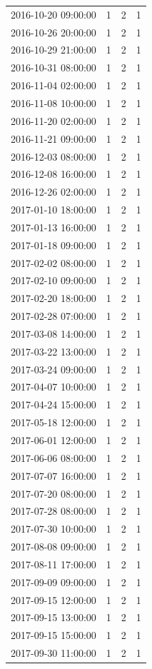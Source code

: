 \begin{tabular}{lrrr}
2016-10-20 09:00:00 & 1 & 2 & 1 \\
2016-10-26 20:00:00 & 1 & 2 & 1 \\
2016-10-29 21:00:00 & 1 & 2 & 1 \\
2016-10-31 08:00:00 & 1 & 2 & 1 \\
2016-11-04 02:00:00 & 1 & 2 & 1 \\
2016-11-08 10:00:00 & 1 & 2 & 1 \\
2016-11-20 02:00:00 & 1 & 2 & 1 \\
2016-11-21 09:00:00 & 1 & 2 & 1 \\
2016-12-03 08:00:00 & 1 & 2 & 1 \\
2016-12-08 16:00:00 & 1 & 2 & 1 \\
2016-12-26 02:00:00 & 1 & 2 & 1 \\
2017-01-10 18:00:00 & 1 & 2 & 1 \\
2017-01-13 16:00:00 & 1 & 2 & 1 \\
2017-01-18 09:00:00 & 1 & 2 & 1 \\
2017-02-02 08:00:00 & 1 & 2 & 1 \\
2017-02-10 09:00:00 & 1 & 2 & 1 \\
2017-02-20 18:00:00 & 1 & 2 & 1 \\
2017-02-28 07:00:00 & 1 & 2 & 1 \\
2017-03-08 14:00:00 & 1 & 2 & 1 \\
2017-03-22 13:00:00 & 1 & 2 & 1 \\
2017-03-24 09:00:00 & 1 & 2 & 1 \\
2017-04-07 10:00:00 & 1 & 2 & 1 \\
2017-04-24 15:00:00 & 1 & 2 & 1 \\
2017-05-18 12:00:00 & 1 & 2 & 1 \\
2017-06-01 12:00:00 & 1 & 2 & 1 \\
2017-06-06 08:00:00 & 1 & 2 & 1 \\
2017-07-07 16:00:00 & 1 & 2 & 1 \\
2017-07-20 08:00:00 & 1 & 2 & 1 \\
2017-07-28 08:00:00 & 1 & 2 & 1 \\
2017-07-30 10:00:00 & 1 & 2 & 1 \\
2017-08-08 09:00:00 & 1 & 2 & 1 \\
2017-08-11 17:00:00 & 1 & 2 & 1 \\
2017-09-09 09:00:00 & 1 & 2 & 1 \\
2017-09-15 12:00:00 & 1 & 2 & 1 \\
2017-09-15 13:00:00 & 1 & 2 & 1 \\
2017-09-15 15:00:00 & 1 & 2 & 1 \\
2017-09-30 11:00:00 & 1 & 2 & 1 \\
\bottomrule
\end{tabular}
